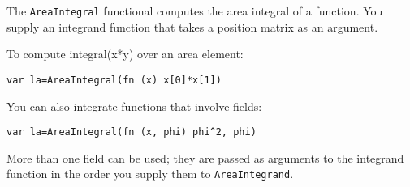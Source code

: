 The \texttt{AreaIntegral} functional computes the area integral of a
function. You supply an integrand function that takes a position matrix
as an argument.

To compute integral(x*y) over an area element:

\begin{lstlisting}
var la=AreaIntegral(fn (x) x[0]*x[1])
\end{lstlisting}

You can also integrate functions that involve fields:

\begin{lstlisting}
var la=AreaIntegral(fn (x, phi) phi^2, phi)
\end{lstlisting}

More than one field can be used; they are passed as arguments to the
integrand function in the order you supply them to
\texttt{AreaIntegrand}.
